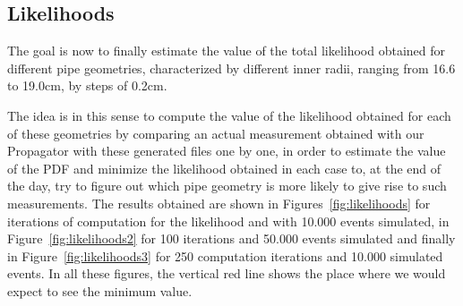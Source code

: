 \documentclass[a4paper, 11pt]{report}
\begin{document}
\subsection{Likelihoods}

The goal is now to finally estimate the value of the total likelihood obtained for different pipe geometries, characterized by different inner radii, ranging from 16.6 to 19.0cm, by steps of 0.2cm.

The idea is in this sense to compute the value of the likelihood obtained for each of these geometries by comparing an actual measurement obtained with our Propagator with these generated files one by one, in order to estimate the value of the PDF and minimize the likelihood obtained in each case to, at the end of the day, try to figure out which pipe geometry is more likely to give rise to such measurements. The results obtained are shown in Figures~\ref{fig:likelihoods} for iterations of computation for the likelihood and with 10.000 events simulated, in Figure~\ref{fig:likelihoods2} for 100 iterations and 50.000 events simulated and finally in Figure~\ref{fig:likelihoods3} for 250 computation iterations and 10.000 simulated events. In all these figures, the vertical red line shows the place where we would expect to see the minimum value.
\end{document}

